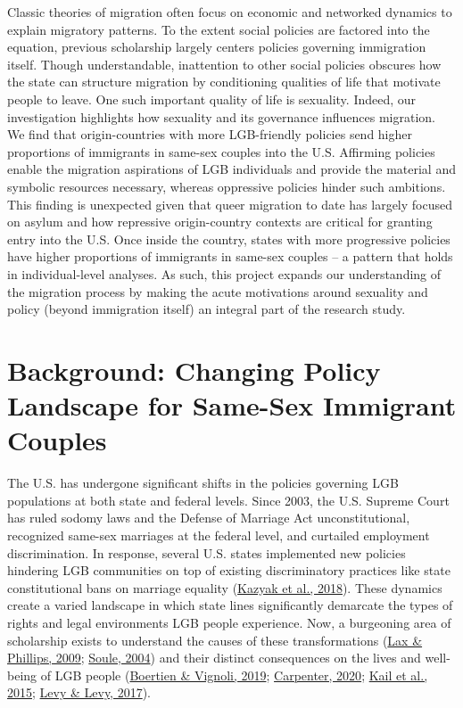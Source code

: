 \documentclass[
  11pt,
]{article}
\begin{document}
Classic theories of migration often focus on economic and networked dynamics to explain migratory patterns. To the extent social policies are factored into the equation, previous scholarship largely centers policies governing immigration itself. Though understandable, inattention to other social policies obscures how the state can structure migration by conditioning qualities of life that motivate people to leave. One such important quality of life is sexuality. Indeed, our investigation highlights how sexuality and its governance influences migration. We find that origin-countries with more LGB-friendly policies send higher proportions of immigrants in same-sex couples into the U.S. Affirming policies enable the migration aspirations of LGB individuals and provide the material and symbolic resources necessary, whereas oppressive policies hinder such ambitions. This finding is unexpected given that queer migration to date has largely focused on asylum and how repressive origin-country contexts are critical for granting entry into the U.S. Once inside the country, states with more progressive policies have higher proportions of immigrants in same-sex couples -- a pattern that holds in individual-level analyses. As such, this project expands our understanding of the migration process by making the acute motivations around sexuality and policy (beyond immigration itself) an integral part of the research study.

\hypertarget{background-changing-policy-landscape-for-same-sex-immigrant-couples}{%
\section{Background: Changing Policy Landscape for Same-Sex Immigrant Couples}\label{background-changing-policy-landscape-for-same-sex-immigrant-couples}}

The U.S. has undergone significant shifts in the policies governing LGB populations at both state and federal levels. Since 2003, the U.S. Supreme Court has ruled sodomy laws and the Defense of Marriage Act unconstitutional, recognized same-sex marriages at the federal level, and curtailed employment discrimination. In response, several U.S. states implemented new policies hindering LGB communities on top of existing discriminatory practices like state constitutional bans on marriage equality (\protect\hyperlink{ref-kazyak_2018}{Kazyak et al., 2018}). These dynamics create a varied landscape in which state lines significantly demarcate the types of rights and legal environments LGB people experience. Now, a burgeoning area of scholarship exists to understand the causes of these transformations (\protect\hyperlink{ref-lax_2009}{Lax \& Phillips, 2009}; \protect\hyperlink{ref-soule_2004}{Soule, 2004}) and their distinct consequences on the lives and well-being of LGB people (\protect\hyperlink{ref-boertien_2019}{Boertien \& Vignoli, 2019}; \protect\hyperlink{ref-carpenter_2020}{Carpenter, 2020}; \protect\hyperlink{ref-kail_2015}{Kail et al., 2015}; \protect\hyperlink{ref-levy_2017}{Levy \& Levy, 2017}).
\end{document}

